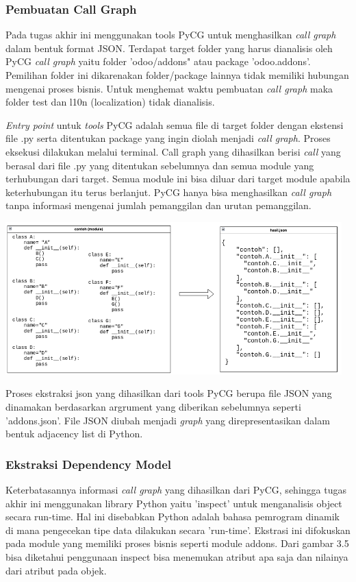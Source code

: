 \subsubsection{Pembuatan Call Graph}
Pada tugas akhir ini menggunakan tools PyCG untuk menghasilkan \textit{call graph} dalam bentuk format JSON. Terdapat target folder yang harus dianalisis oleh PyCG \textit{call graph} yaitu folder 'odoo/addons" atau package 'odoo.addons'. Pemilihan folder ini dikarenakan folder/package lainnya tidak memiliki hubungan mengenai proses bisnis. Untuk menghemat waktu pembuatan \textit{call graph} maka folder test dan l10n (localization) tidak dianalisis.  

\textit{Entry point} untuk \textit{tools} PyCG adalah semua file di target folder dengan ekstensi file .py serta ditentukan package yang ingin diolah menjadi \textit{call graph}. Proses eksekusi dilakukan melalui terminal. Call graph yang dihasilkan berisi \textit{call} yang berasal dari file .py yang ditentukan sebelumnya dan semua module yang terhubungan dari target. Semua module ini bisa diluar dari target module apabila keterhubungan itu terus berlanjut. PyCG hanya bisa menghasilkan \textit{call graph} tanpa informasi mengenai jumlah pemanggilan dan urutan pemanggilan.

\begin{center}
	\includegraphics[width=13cm]{img/bab_3/soToCG.png}
	\label{contoh_json_pycg}
\end{center}

Proses ekstraksi json yang dihasilkan dari tools PyCG berupa file JSON yang dinamakan berdasarkan argrument yang diberikan sebelumnya seperti 'addons.json'. File JSON diubah menjadi \textit{graph} yang direpresentasikan dalam bentuk adjacency list di Python.

\subsubsection{Ekstraksi Dependency Model}
Keterbatasannya informasi \textit{call graph} yang dihasilkan dari PyCG, sehingga tugas akhir ini menggunakan library Python yaitu 'inspect' untuk menganalisis object secara run-time. Hal ini disebabkan Python adalah bahasa pemrogram dinamik di mana pengecekan tipe data dilakukan secara 'run-time'. Ekstrasi ini difokuskan pada module yang memiliki proses bisnis seperti module addons. Dari gambar 3.5 bisa diketahui penggunaan inspect bisa menemukan atribut apa saja dan nilainya dari atribut pada objek. 

